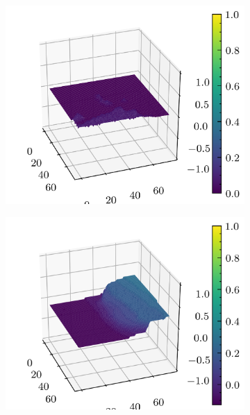 \documentclass[../document.tex]{subfiles}
\begin{document}
\begin{figure}[H]
\begin{subfigure}[b]{0.19\textwidth}
        \includegraphics[width=\linewidth]{../img/5/quarry/false_positive/patch-3d-2.png}
    \end{subfigure}
    \begin{subfigure}[b]{0.19\textwidth}
        \includegraphics[width=\linewidth]{../img/5/quarry/false_positive/patch-3d-3.png}
    \end{subfigure}  
    \begin{subfigure}[b]{0.19\textwidth}

\end{subfigure}
\end{figure}
\end{document}
